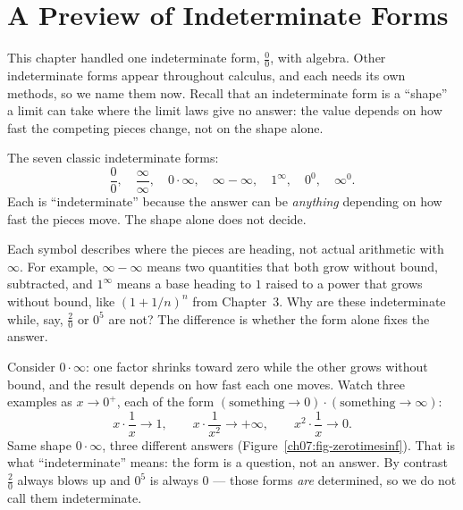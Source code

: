 \section{A Preview of Indeterminate Forms}
\label{ch07:indeterminate}

This chapter handled one indeterminate form, $\frac00$, with
algebra. Other indeterminate forms appear throughout calculus, and each needs its own
methods, so we name them now. Recall that an indeterminate form is a
``shape'' a limit can take where the limit laws give no answer:
the value depends on how fast the competing pieces change, not on the shape alone.

\begin{focusbox}
The seven classic indeterminate forms:
\[
  \frac{0}{0},\quad \frac{\infty}{\infty},\quad 0\cdot\infty,\quad
  \infty-\infty,\quad 1^{\infty},\quad 0^{0},\quad \infty^{0}.
\]
Each is ``indeterminate'' because the answer can be \emph{anything} depending
on how fast the pieces move. The shape alone does not decide.
\end{focusbox}

Each symbol describes where the pieces are heading, not actual arithmetic with
$\infty$. For example, $\infty-\infty$ means two quantities that both grow without
bound, subtracted, and $1^{\infty}$ means a base heading to $1$ raised to a power
that grows without bound, like $(1+1/n)^{n}$ from Chapter~3.
Why are these indeterminate while, say, $\frac{2}{0}$ or $0^{5}$ are not? The
difference is whether the form alone fixes the answer.

\begin{intuitionbox}
Consider $0\cdot\infty$: one factor shrinks toward zero while the other
grows without bound, and the result depends on how fast each one moves. Watch three examples as $x\to 0^{+}$, each of the form
$(\text{something}\to 0)\cdot(\text{something}\to\infty)$:
\[
  x\cdot\frac1x \to 1,
  \qquad
  x\cdot\frac{1}{x^{2}} \to +\infty,
  \qquad
  x^{2}\cdot\frac1x \to 0.
\]
Same shape $0\cdot\infty$, three different answers (Figure~\ref{ch07:fig-zerotimesinf}).
That is what
``indeterminate'' means: the form is a question, not an answer. By contrast
$\frac{2}{0}$ always blows up and $0^{5}$ is always $0$ --- those forms
\emph{are} determined, so we do not call them indeterminate.
\end{intuitionbox}

